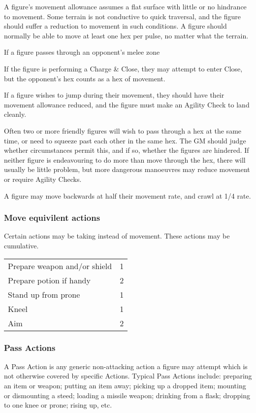 \begin{multicols*}{3}
A figure's movement allowance assumes a flat surface with little or no
hindrance to movement. Some terrain is not conductive to quick
traversal, and the figure should suffer a reduction to movement in
such conditions. A figure should normally be able to move at least one
hex per pulse, no matter what the terrain.

If a figure passes through an opponent's melee zone 

If the figure is performing a Charge \& Close, they may attempt to
enter Close, but the opponent's hex counts as a hex of movement.

If a figure wishes to jump during their movement, they should have
their movement allowance reduced, and the figure must make an Agility
Check to land cleanly.

Often two or more friendly figures will wish to pass through a hex at
the same time, or need to squeeze past each other in the same hex. The
GM should judge whether circumstances permit this, and if so, whether
the figures are hindered. If neither figure is endeavouring to do more
than move through the hex, there will usually be little problem, but
more dangerous manoeuvres may reduce movement or require Agility
Checks.

A figure may move backwards at half their movement rate, and crawl at
1/4 rate.

\subsubsection{Move equivilent actions}

Certain actions may be taking instead of movement.  These actions
may be cumulative.

\begin{tabularx}{\linewidth}{Xr}
Prepare weapon and/or shield		& 1 \\
Prepare potion if handy			& 2 \\
Stand up from prone			& 1 \\
Kneel					& 1 \\
Aim					& 2 \\
\end{tabularx}

\subsubsection{Pass Actions}

A Pass Action is any generic non-attacking action a figure may attempt
which is not otherwise covered by specific Actions. Typical Pass
Actions include: preparing an item or weapon; putting an item away;
picking up a dropped item; mounting or dismounting a steed; loading a
missile weapon; drinking from a flask; dropping to one knee or prone;
rising up, etc.


\end{multicols*}
